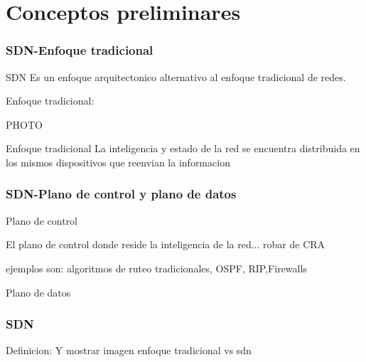 \documentclass{beamer}
\begin{document}

\section{Conceptos preliminares} 


\begin{frame}
\frametitle{SDN-Enfoque tradicional} 


SDN Es un enfoque arquitectonico alternativo al enfoque tradicional de redes.

Enfoque tradicional:

PHOTO

\begin{block}{Enfoque tradicional}
La inteligencia y estado de la red se encuentra distribuida en los mismos dispositivos que reenvian la informacion
\end{block}


\end{frame}

\begin{frame}
\frametitle{SDN-Plano de control y plano de datos} 


\begin{block}{Plano de control}

El plano de control donde reside la inteligencia de la red... robar de CRA
\end{block}
ejemplos son: algoritmos de ruteo tradicionales, OSPF, RIP,Firewalls


\begin{block}{Plano de datos}
\end{block}




\end{frame}

\begin{frame}
\frametitle{SDN} 
Definicion:
Y mostrar imagen enfoque tradicional vs sdn

\end{frame}
\end{document}
